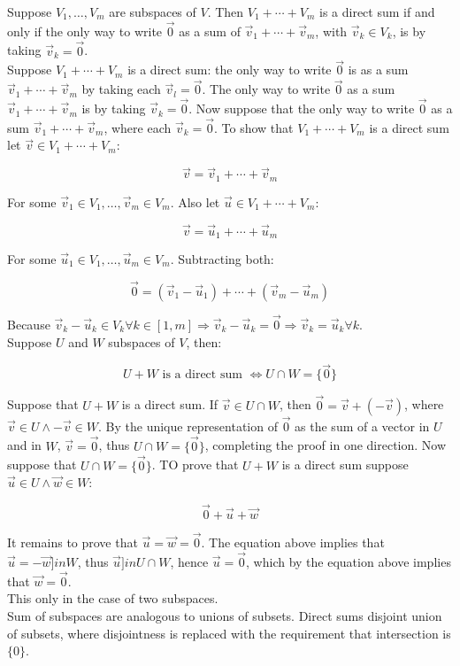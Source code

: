   Suppose $V_1,\dots,V_m$ are subspaces of $V$.
  Then $V_1+\cdots +V_m$ is a direct sum if and only if the only way to write $\vec{0}$ as a sum of $\vec{v}_1+\cdots+\vec{v}_m$, with $\vec{v}_k\in V_k$, is by taking $\vec{v}_k = \vec{0}$.\\
  Suppose $V_1+\cdots + V_m$ is a direct sum: the only way to write $\vec{0}$ is as a sum $\vec{v}_1+\cdots+\vec{v}_m$ by taking each $\vec{v}_l = \vec{0}$.
  The only way to write $\vec{0}$ as a sum $\vec{v}_1 + \cdots + \vec{v}_m$ is by taking $\vec{v}_k = \vec{0}$.
  Now suppose that the only way to write $\vec{0}$ as a sum $\vec{v}_1+\cdots+\vec{v}_m$, where each $\vec{v}_k = \vec{0}$.
  To show that $V_1+\cdots+V_m$ is a direct sum let $\vec{v} \in V_1+\cdots + V_m$:

  $$\vec{v} = \vec{v}_1 + \cdots + \vec{v}_m$$

  For some $\vec{v}_1\in V_1, \dots, \vec{v}_m\in V_m$.
  Also  let $\vec{u} \in V_1+\cdots + V_m$:

  $$\vec{v} = \vec{u}_1 + \cdots + \vec{u}_m$$

  For some $\vec{u}_1\in V_1, \dots, \vec{u}_m\in V_m$.
  Subtracting both:

  $$\vec{0} = (\vec{v}_1 - \vec{u}_1) + \cdots + (\vec{v}_m - \vec{u}_m)$$

  Because $\vec{v}_k - \vec{u}_k\in V_k\forall k\in[1,m]\Rightarrow \vec{v}_k-\vec{u}_k = \vec{0}\Rightarrow \vec{v}_k = \vec{u}_k\forall k$.\\
  Suppose $U$ and $W$ subspaces of $V$, then:

  $$U + W \text{ is a direct sum } \Leftrightarrow U\cap W = \{\vec{0}\}$$

  Suppose that $U + W$ is a direct sum.
  If $\vec{v}\in U\cap W$, then $\vec{0} = \vec{v} + (-\vec{v})$, where $\vec{v}\in U\land -\vec{v}\in W$.
  By the unique representation of $\vec{0}$ as the sum of a vector in $U$ and in $W$, $\vec{v} = \vec{0}$, thus $U\cap W = \{\vec{0}\}$, completing the proof in one direction.
  Now suppose that $U\cap W = \{\vec{0}\}$. TO prove that $U+W$ is a direct sum suppose $\vec{u}\in U\land \vec{w}\in W$:

  $$\vec{0} + \vec{u} + \vec{w}$$

  It remains to prove that $\vec{u} = \vec{w} = \vec{0}$.
  The equation above implies that $\vec{u} = -\vec{w} ]in W$, thus $\vec{u}]in U\cap W$, hence $\vec{u} = \vec{0}$, which by the equation above implies that $\vec{w} = \vec{0}$.\\
  This only in the case of two subspaces.\\
  Sum of subspaces are analogous to unions of subsets.
  Direct sums disjoint union of subsets, where disjointness is replaced with the requirement that intersection is $\{0\}$.
